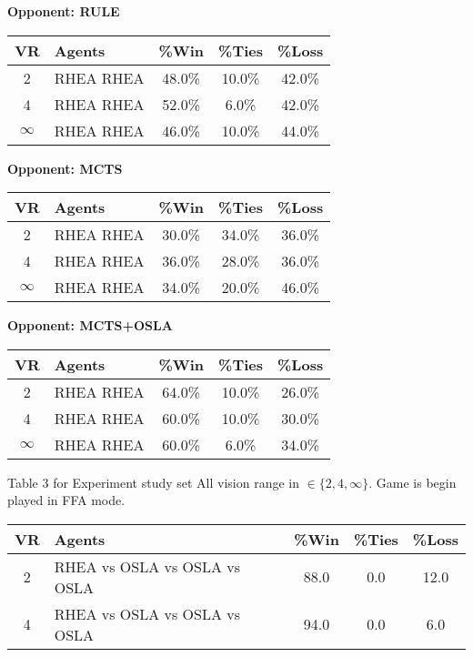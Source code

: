 \documentclass{report}
\begin{document}
\begin{center}
 \textbf{Opponent: RULE}
 	 \begin{tabularx}{330pt}{|c|X|c|c|c|}
 	\hline
 	VR & Agents & \%Win & \%Ties & \%Loss\\
 	\hline
 	2 & RHEA RHEA & 48.0\%	&10.0\%	&42.0\%\\
 	\hline
 	4 & RHEA RHEA & 52.0\%	&6.0\%	&42.0\%\\
 	\hline
 	$\infty$ &RHEA RHEA &46.0\%	&10.0\%	&44.0\% \\
 	\hline
 \end{tabularx}
\newline
\newline
\textbf{Opponent: MCTS}
\begin{tabularx}{330pt}{|c|X|c|c|c|}
	\hline
	VR & Agents & \%Win & \%Ties & \%Loss \\
	\hline
	2 & RHEA  RHEA &30.0\%	&34.0\%	&36.0\%\\
	\hline
	4 & RHEA  RHEA& 36.0\%	&28.0\% &	36.0\%\\
	\hline
	$\infty$ &RHEA  RHEA & 34.0\%	&20.0\%	&46.0\%\\
	\hline
\end{tabularx}
\newline
\newline
\newline
\newline
\newline
\textbf{Opponent: MCTS+OSLA}
\begin{tabularx}{330pt}{|c|X|c|c|c|}
	\hline
	VR & Agents & \%Win & \%Ties & \%Loss \\
	\hline
	2 & RHEA  RHEA &64.0\%	&10.0\%	&26.0\% \\
	\hline
	4 & RHEA  RHEA& 60.0\%	&10.0\%	&30.0\% \\
	\hline
	$\infty$ &RHEA  RHEA & 60.0\%	&6.0\%	&34.0\%\\
	\hline
\end{tabularx}\newline\newline
Table 3 for Experiment study set All  vision range in $ \in \{2, 4, \infty\}$. Game is begin played in FFA mode.\newline
\begin{tabularx}{400pt}{|c|X|c|c|c|}
	\hline
	VR& Agents & \%Win & \%Ties & \%Loss\\
	\hline
	2 & RHEA vs OSLA vs OSLA vs OSLA & 88.0&0.0  &12.0\\
	\hline
	4&  RHEA vs OSLA vs OSLA vs OSLA& 94.0&0.0 &6.0 \\

\end{tabularx}
\end{center}
\end{document}

